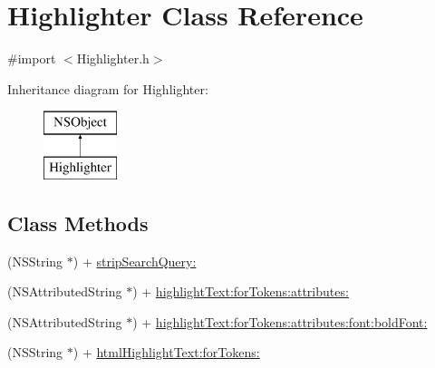 \hypertarget{interface_highlighter}{\section{Highlighter Class Reference}
\label{interface_highlighter}
}


{\ttfamily \#import $<$Highlighter.\-h$>$}

Inheritance diagram for Highlighter\-:\begin{figure}[H]
\begin{center}
\leavevmode
\includegraphics[height=2.000000cm]{interface_highlighter}
\end{center}
\end{figure}
\subsection*{Class Methods}
\begin{DoxyCompactItemize}
\item 
(N\-S\-String $\ast$) + \hyperlink{interface_highlighter_a39d72ac7fb96b9e8e6e721a2d2424805}{strip\-Search\-Query\-:}
\item 
(N\-S\-Attributed\-String $\ast$) + \hyperlink{interface_highlighter_adb6cbaa32dbd4532befb08653885dd10}{highlight\-Text\-:for\-Tokens\-:attributes\-:}
\item 
(N\-S\-Attributed\-String $\ast$) + \hyperlink{interface_highlighter_a68671334c47b0b75a35ea38b532566ed}{highlight\-Text\-:for\-Tokens\-:attributes\-:font\-:bold\-Font\-:}
\item 
(N\-S\-String $\ast$) + \hyperlink{interface_highlighter_a1d0365282c55f33163ccd891b6050eb2}{html\-Highlight\-Text\-:for\-Tokens\-:}
\end{DoxyCompactItemize}


